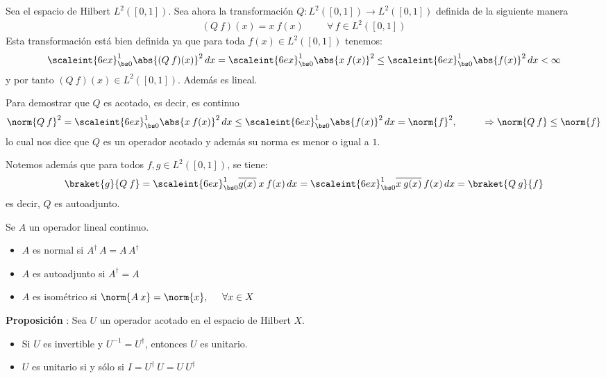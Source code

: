 Sea el espacio de Hilbert $L^{2} ([0, 1])$. Sea ahora la transformación $Q : L^{2} ([0, 1]) \rightarrow L^{2}([0, 1])$ definida de la siguiente manera
\begin{align*} (Q \: f)(x) =  x \: f(x) \hspace{1cm} \forall \, f \in L^{2}([0, 1]) \end{align*}
Esta transformación está bien definida ya que para toda $f(x) \in L^{2} ([0, 1])$ tenemos:
\begin{align*} \scaleint{6ex}_{\bs 0}^{1} \abs{(Q \: f)(x)}^{2} \, dx = \scaleint{6ex}_{\bs 0}^{1} \abs{x \: f(x)}^{2} \leq \scaleint{6ex}_{\bs 0}^{1} \abs{f(x)}^{2} \, dx < \infty \end{align*}
y por tanto $(Q \: f)(x) \in L^{2}([0, 1])$. Además es lineal.
\par
Para demostrar que $Q$ es acotado, es decir, es continuo
\begin{align*} \norm{Q \: f}^{2} = \scaleint{6ex}_{\bs 0}^{1} \abs{x \: f(x)}^{2} \, dx   \leq \scaleint{6ex}_{\bs 0}^{1} \abs{f(x)}^{2} \, dx = \norm{f}^{2}, \hspace{1cm} \Rightarrow \norm{Q \: f} \leq \norm{f} \end{align*}
lo cual nos dice que $Q$ es un operador acotado y además su norma es menor o igual a $1$.

Notemos además que para todos $f, g \in L^{2} ([0, 1])$, se tiene:
\begin{align*} \braket{g}{Q \: f} = \scaleint{6ex}_{\bs 0}^{1} \overline{g(x)} \: x \: f(x) \, dx = \scaleint{6ex}_{\bs 0}^{1} \overline{x \: g(x)} \: f(x) \, dx = \braket{Q \: g}{f} \end{align*}
es decir, $Q$ es autoadjunto.
\begin{defi} Se $A$ un operador lineal continuo.
\begin{itemize}
\item $A$ es normal si $A^{\dagger} \, A = A \, A^{\dagger}$
\item $A$ es autoadjunto si $A^{\dagger} =  A$
\item $A$ es isométrico si $\norm{A \: x} =  \norm{x}, \hspace{0.5cm} \forall x \in X$
\end{itemize}
\end{defi}
\textbf{Proposición} : Sea $U$ un operador acotado en el espacio de Hilbert $X$.
\begin{itemize}
\item Si $U$ es invertible y $U^{-1} = U^{\dagger}$, entonces $U$ es unitario.
\item $U$ es unitario si y sólo si $I = U^{\dagger} \: U = U \: U^{\dagger}$ 
\end{itemize}

